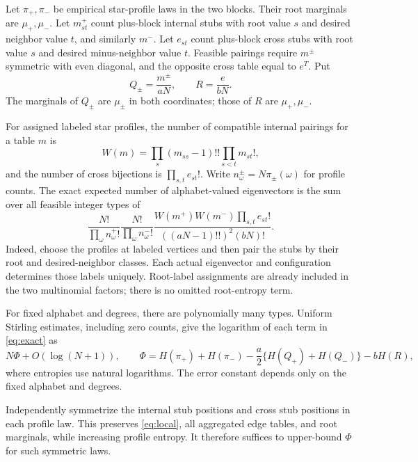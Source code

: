 \documentclass[11pt]{article}
\begin{document}
Let $\pi_+,\pi_-$ be empirical star-profile laws in the two blocks. Their root marginals are $\mu_+,\mu_-$. Let $m^+_{st}$ count plus-block internal stubs with root value $s$ and desired neighbor value $t$, and similarly $m^-$. Let $e_{st}$ count plus-block cross stubs with root value $s$ and desired minus-neighbor value $t$. Feasible pairings require $m^\pm$ symmetric with even diagonal, and the opposite cross table equal to $e^T$. Put
\[
 Q_\pm=\frac{m^\pm}{aN},\qquad R=\frac e{bN}.
\]
The marginals of $Q_\pm$ are $\mu_\pm$ in both coordinates; those of $R$ are $\mu_+,\mu_-$.

For assigned labeled star profiles, the number of compatible internal pairings for a table $m$ is
\[
 W(m)=\prod_{s}(m_{ss}-1)!!\prod_{s<t}m_{st}!,
\]
and the number of cross bijections is $\prod_{s,t}e_{st}!$. Write $n^\pm_\omega=N\pi_\pm(\omega)$ for profile counts. The exact expected number of alphabet-valued eigenvectors is the sum over all feasible integer types of
\begin{equation}\label{eq:exact}
 \frac{N!}{\prod_\omega n^+_\omega!}
 \frac{N!}{\prod_\omega n^-_\omega!}
 \frac{W(m^+)W(m^-)\prod_{s,t}e_{st}!}
 {((aN-1)!!)^2(bN)!}.
\end{equation}
Indeed, choose the profiles at labeled vertices and then pair the stubs by their root and desired-neighbor classes. Each actual eigenvector and configuration determines those labels uniquely. Root-label assignments are already included in the two multinomial factors; there is no omitted root-entropy term.

For fixed alphabet and degrees, there are polynomially many types. Uniform Stirling estimates, including zero counts, give the logarithm of each term in \eqref{eq:exact} as
\begin{equation}\label{eq:Phi}
 N\Phi+O(\log(N+1)),\qquad
 \Phi=H(\pi_+)+H(\pi_-)-\frac a2\{H(Q_+)+H(Q_-)\}-bH(R),
\end{equation}
where entropies use natural logarithms. The error constant depends only on the fixed alphabet and degrees.

Independently symmetrize the internal stub positions and cross stub positions in each profile law. This preserves \eqref{eq:local}, all aggregated edge tables, and root marginals, while increasing profile entropy. It therefore suffices to upper-bound $\Phi$ for such symmetric laws.
\end{document}
